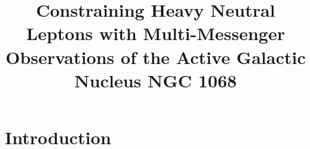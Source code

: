 \documentclass{article}
\begin{document}
\title{Constraining Heavy Neutral Leptons with Multi-Messenger Observations of the Active Galactic Nucleus NGC 1068}





\section{Introduction} \label{sec:intro}
\end{document}
